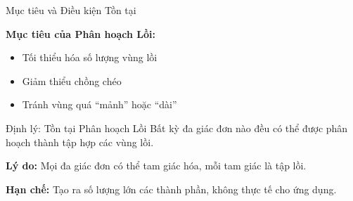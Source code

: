 \documentclass[aspectratio=169]{beamer}
\begin{document}
\begin{frame}{Mục tiêu và Điều kiện Tồn tại}

    \textbf{Mục tiêu của Phân hoạch Lồi:}
    \begin{itemize}
        \item Tối thiểu hóa số lượng vùng lồi
        \item Giảm thiểu chồng chéo
        \item Tránh vùng quá ``mảnh'' hoặc ``dài''
    \end{itemize}

    \vspace{1em}
    \begin{exampleblock}{Định lý: Tồn tại Phân hoạch Lồi}
        Bất kỳ đa giác đơn nào đều có thể được phân hoạch thành tập hợp các vùng lồi.

        \textbf{Lý do:} Mọi đa giác đơn có thể tam giác hóa, mỗi tam giác là tập lồi.

        \textbf{Hạn chế:} Tạo ra số lượng lớn các thành phần, không thực tế cho ứng dụng.
    \end{exampleblock}

\end{frame}
\end{document}
